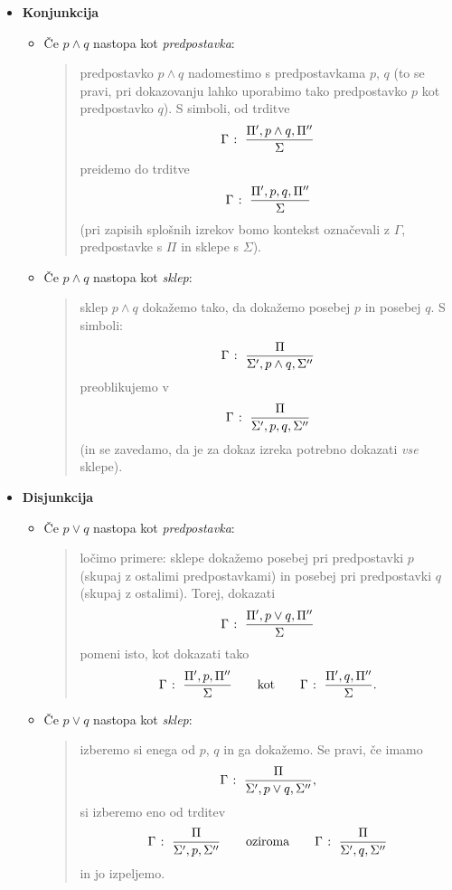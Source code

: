 	\begin{itemize}
		\item\textbf{Konjunkcija}
			\begin{itemize}
				\item
					Če $p \land q$ nastopa kot \emph{predpostavka}:
					\begin{quote}
						predpostavko $p \land q$ nadomestimo s predpostavkama $p$, $q$ (to se pravi, pri dokazovanju lahko uporabimo tako predpostavko $p$ kot predpostavko $q$). S simboli, od trditve
						\[{\Gamma} \;\colon\; \frac{\Pi', p \land q, \Pi''}{\Sigma}\]
						preidemo do trditve
						\[{\Gamma} \;\colon\; \frac{\Pi', p, q, \Pi''}{\Sigma}\]
						(pri zapisih splošnih izrekov bomo kontekst označevali z $\Gamma$, predpostavke s $\Pi$ in sklepe s $\Sigma$).
					\end{quote}
				\item
					Če $p \land q$ nastopa kot \emph{sklep}:
					\begin{quote}
						sklep $p \land q$ dokažemo tako, da dokažemo posebej $p$ in posebej $q$. S simboli:
						\[{\Gamma} \;\colon\; \frac{\Pi}{\Sigma', p \land q, \Sigma''}\]
						preoblikujemo v
						\[{\Gamma} \;\colon\; \frac{\Pi}{\Sigma', p, q, \Sigma''}\]
						(in se zavedamo, da je za dokaz izreka potrebno dokazati \emph{vse} sklepe).
					\end{quote}
			\end{itemize}
		\item\textbf{Disjunkcija}
			\begin{itemize}
				\item
					Če $p \lor q$ nastopa kot \emph{predpostavka}:
					\begin{quote}
						ločimo primere: sklepe dokažemo posebej pri predpostavki $p$ (skupaj z ostalimi predpostavkami) in posebej pri predpostavki $q$ (skupaj z ostalimi). Torej, dokazati
						\[{\Gamma} \;\colon\; \frac{\Pi', p \lor q, \Pi''}{\Sigma}\]
						pomeni isto, kot dokazati tako
						\[{\Gamma} \;\colon\; \frac{\Pi', p, \Pi''}{\Sigma} \qquad \text{kot} \qquad {\Gamma} \;\colon\; \frac{\Pi', q, \Pi''}{\Sigma}.\]
					\end{quote}
				\item
					Če $p \lor q$ nastopa kot \emph{sklep}:
					\begin{quote}
						izberemo si enega od $p$, $q$ in ga dokažemo. Se pravi, če imamo
						\[{\Gamma} \;\colon\; \frac{\Pi}{\Sigma', p \lor q, \Sigma''},\]
						si izberemo eno od trditev
						\[{\Gamma} \;\colon\; \frac{\Pi}{\Sigma', p, \Sigma''} \qquad \text{oziroma} \qquad {\Gamma} \;\colon\; \frac{\Pi}{\Sigma', q, \Sigma''}\]
						in jo izpeljemo.

\end{quote}
\end{itemize}
\end{itemize}

